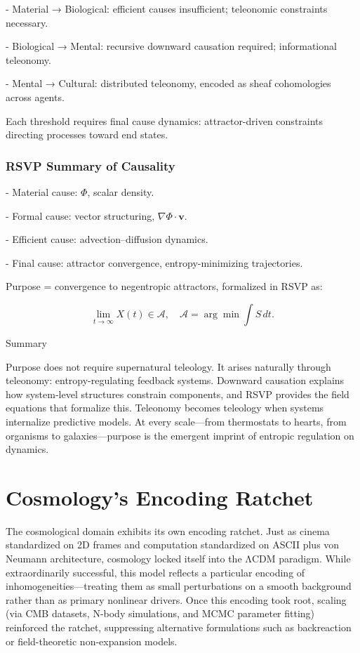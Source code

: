 \documentclass[12pt]{book}
\begin{document}
- Material → Biological: efficient causes insufficient; teleonomic constraints necessary.

- Biological → Mental: recursive downward causation required; informational teleonomy.

- Mental → Cultural: distributed teleonomy, encoded as sheaf cohomologies across agents.

Each threshold requires final cause dynamics: attractor-driven constraints directing processes toward end states.

\subsection{RSVP Summary of Causality}
- Material cause: \( \Phi \), scalar density.

- Formal cause: vector structuring, \( \nabla \Phi \cdot \mathbf{v} \).

- Efficient cause: advection–diffusion dynamics.

- Final cause: attractor convergence, entropy-minimizing trajectories.

Purpose = convergence to negentropic attractors, formalized in RSVP as:

\[ \lim_{t \to \infty} X(t) \in \mathcal{A}, \quad \mathcal{A} = \arg\min \int S \, dt. \]

Summary

Purpose does not require supernatural teleology. It arises naturally through teleonomy: entropy-regulating feedback systems. Downward causation explains how system-level structures constrain components, and RSVP provides the field equations that formalize this. Teleonomy becomes teleology when systems internalize predictive models. At every scale—from thermostats to hearts, from organisms to galaxies—purpose is the emergent imprint of entropic regulation on dynamics.

\chapter{Cosmology’s Encoding Ratchet}
The cosmological domain exhibits its own encoding ratchet. Just as cinema standardized on 2D frames and computation standardized on ASCII plus von Neumann architecture, cosmology locked itself into the ΛCDM paradigm. While extraordinarily successful, this model reflects a particular encoding of inhomogeneities—treating them as small perturbations on a smooth background rather than as primary nonlinear drivers. Once this encoding took root, scaling (via CMB datasets, N-body simulations, and MCMC parameter fitting) reinforced the ratchet, suppressing alternative formulations such as backreaction or field-theoretic non-expansion models.
\end{document}
